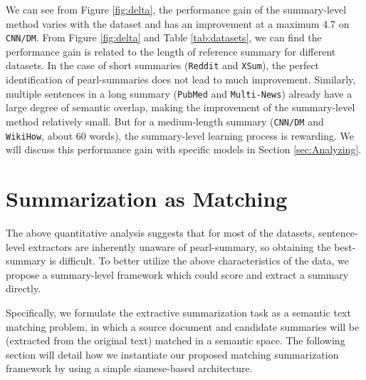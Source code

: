 \documentclass[11pt,a4paper]{article}
\begin{document}
We can see from Figure \ref{fig:delta}, the performance gain of the summary-level method varies with the dataset and has an improvement at a maximum 4.7 on \texttt{CNN/DM}. From Figure \ref{fig:delta} and Table \ref{tab:datasets}, we can find the performance gain is related to the length of reference summary for different datasets. In the case of short summaries (\texttt{Reddit} and \texttt{XSum}), the perfect identification of pearl-summaries does not lead to much improvement. Similarly, multiple sentences in a long summary (\texttt{PubMed} and \texttt{Multi-News}) already have a large degree of semantic overlap, making the improvement of the summary-level method relatively small. But for a medium-length summary (\texttt{CNN/DM} and \texttt{WikiHow}, about 60 words), the summary-level learning process is rewarding. We will discuss this performance gain with specific models in Section \ref{sec:Analyzing}.
























\section{Summarization as Matching}
\label{sec:model}



















The above quantitative analysis suggests that for most of the datasets, sentence-level extractors are inherently unaware of pearl-summary, so obtaining the best-summary is difficult. To better utilize the above characteristics of the data, we propose a summary-level framework which could score and extract a summary directly.

Specifically, we formulate the extractive summarization task as a semantic text matching problem,   in  which  a  source  document and  candidate  summaries  will  be  (extracted from the original text) matched in a semantic space.
The following section will detail how we instantiate our proposed matching summarization framework by using a simple siamese-based architecture.
\end{document}
